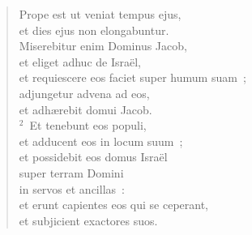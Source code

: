 \begin{flushleft}\begin{verse}\vspace{-19pt}\hspace{6pt}Prope est ut veniat tempus ejus,\\\hspace{6pt} et dies ejus non elongabuntur.\\ Miserebitur enim Dominus Jacob,\\ et eliget adhuc de Isra\"el,\\ et requiescere eos faciet super humum suam~;\\ adjungetur advena ad eos,\\ et adh\ae rebit domui Jacob.\\
${}^{2}$~Et tenebunt eos populi,\\ et adducent eos in locum suum~;\\ et possidebit eos domus Isra\"el\\ super terram Domini\\ in servos et ancillas~:\\ et erunt capientes eos qui se ceperant,\\ et subjicient exactores suos.\end{verse}\end{flushleft}


